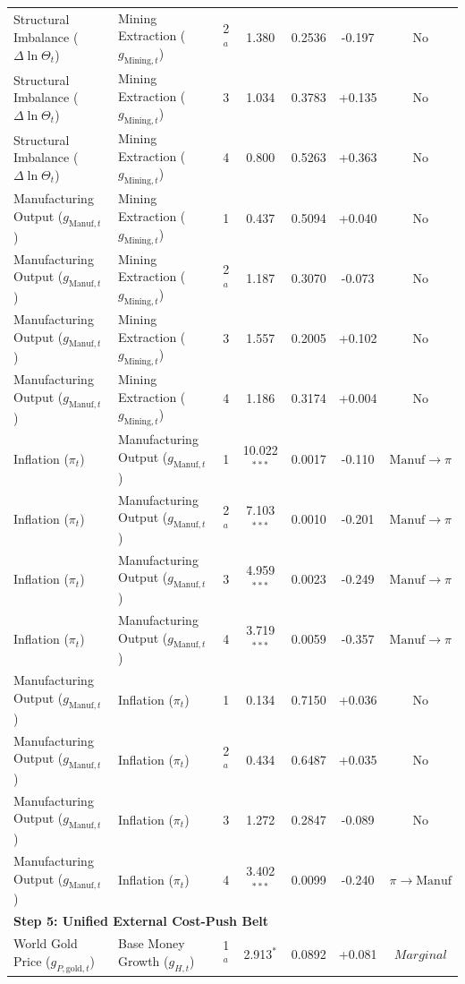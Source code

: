 \begin{table}[p]
{\begin{tabular}{llccccc}
Structural Imbalance ($\Delta \ln \Theta_t$) & Mining Extraction ($g_{\text{Mining},t}$) & 2$^a$ & 1.380 & 0.2536 & -0.197 & No \\
Structural Imbalance ($\Delta \ln \Theta_t$) & Mining Extraction ($g_{\text{Mining},t}$) & 3 & 1.034 & 0.3783 & +0.135 & No \\
Structural Imbalance ($\Delta \ln \Theta_t$) & Mining Extraction ($g_{\text{Mining},t}$) & 4 & 0.800 & 0.5263 & +0.363 & No \\
Manufacturing Output ($g_{\text{Manuf},t}$) & Mining Extraction ($g_{\text{Mining},t}$) & 1 & 0.437 & 0.5094 & +0.040 & No \\
Manufacturing Output ($g_{\text{Manuf},t}$) & Mining Extraction ($g_{\text{Mining},t}$) & 2$^a$ & 1.187 & 0.3070 & -0.073 & No \\
Manufacturing Output ($g_{\text{Manuf},t}$) & Mining Extraction ($g_{\text{Mining},t}$) & 3 & 1.557 & 0.2005 & +0.102 & No \\
Manufacturing Output ($g_{\text{Manuf},t}$) & Mining Extraction ($g_{\text{Mining},t}$) & 4 & 1.186 & 0.3174 & +0.004 & No \\
Inflation ($\pi_t$) & Manufacturing Output ($g_{\text{Manuf},t}$) & 1 & 10.022$^{***}$ & 0.0017 & -0.110 & $\text{Manuf} \to \pi$ \\
Inflation ($\pi_t$) & Manufacturing Output ($g_{\text{Manuf},t}$) & 2$^a$ & 7.103$^{***}$ & 0.0010 & -0.201 & $\text{Manuf} \to \pi$ \\
Inflation ($\pi_t$) & Manufacturing Output ($g_{\text{Manuf},t}$) & 3 & 4.959$^{***}$ & 0.0023 & -0.249 & $\text{Manuf} \to \pi$ \\
Inflation ($\pi_t$) & Manufacturing Output ($g_{\text{Manuf},t}$) & 4 & 3.719$^{***}$ & 0.0059 & -0.357 & $\text{Manuf} \to \pi$ \\
Manufacturing Output ($g_{\text{Manuf},t}$) & Inflation ($\pi_t$) & 1 & 0.134 & 0.7150 & +0.036 & No \\
Manufacturing Output ($g_{\text{Manuf},t}$) & Inflation ($\pi_t$) & 2$^a$ & 0.434 & 0.6487 & +0.035 & No \\
Manufacturing Output ($g_{\text{Manuf},t}$) & Inflation ($\pi_t$) & 3 & 1.272 & 0.2847 & -0.089 & No \\
Manufacturing Output ($g_{\text{Manuf},t}$) & Inflation ($\pi_t$) & 4 & 3.402$^{***}$ & 0.0099 & -0.240 & $\pi \to \text{Manuf}$ \\
\multicolumn{7}{l}{\textbf{Step 5: Unified External Cost-Push Belt}} \\[0.15em]
World Gold Price ($g_{P,\text{gold},t}$) & Base Money Growth ($g_{H,t}$) & 1$^a$ & 2.913$^{*}$ & 0.0892 & +0.081 & $Marginal$ \\

\end{tabular}}
\end{table}
